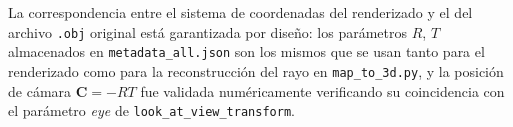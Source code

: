 La correspondencia entre el sistema de coordenadas del renderizado y el del
archivo \texttt{.obj} original está garantizada por diseño: los parámetros $R$,
$T$ almacenados en \texttt{metadata\_all.json} son los mismos que se usan tanto
para el renderizado como para la reconstrucción del rayo en
\texttt{map\_to\_3d.py}, y la posición de cámara $\mathbf{C} = -RT$ fue validada
numéricamente verificando su coincidencia con el parámetro \textit{eye} de
\texttt{look\_at\_view\_transform}.
